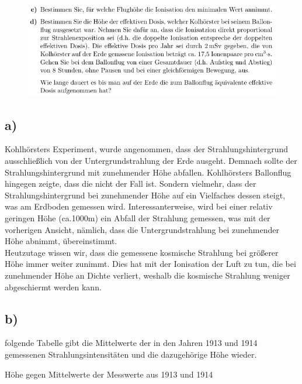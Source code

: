     \begin{figure}[H]
        \centering
        \includegraphics[width=\textwidth]{images/Aufgabe18b.jpg}
        \label{fig:6}
    \end{figure}

\subsection{a)}

    \justifying Kohlhörsters Experiment, wurde angenommen, dass der Strahlungshintergrund ausschließlich von der Untergrundstrahlung der Erde ausgeht. 
    Demnach sollte der Strahlungshintergrund mit zunehmender Höhe abfallen. Kohlhörsters Ballonflug hingegen zeigte, dass die nicht der Fall ist. Sondern vielmehr, dass
    der Strahlungshintergrund bei zunehmender Höhe auf ein Vielfaches dessen steigt, was am Erdboden gemessen wird. Interessanterweise, wird bei einer relativ geringen 
    Höhe (ca.1000m) ein Abfall der Strahlung gemessen, was mit der vorherigen Ansicht, nämlich, dass die Untergrundstrahlung bei zunehmender Höhe abnimmt, übereinstimmt.\\
    Heutzutage wissen wir, dass die gemessene kosmische Strahlung bei größerer Höhe immer weiter zunimmt. Dies hat mit der Ionisation der Luft zu tun, die bei zunehmender
    Höhe an Dichte verliert, weshalb die kosmische Strahlung weniger abgeschiermt werden kann.

\subsection{b)}

    \justifying folgende Tabelle gibt die Mittelwerte der in den Jahren 1913 und 1914 gemessenen Strahlungsintensitäten und die dazugehörige Höhe wieder. 

    \begin{table}[H]
        \centering
        \caption{Höhe gegen Mittelwerte der Messwerte aus 1913 und 1914}
        
        \label{tab:1}
    \end{table}


